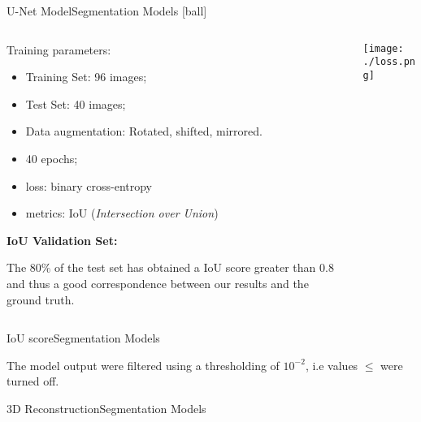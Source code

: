 \documentclass[10pt, technote, oribibl, unicode]{beamer}
\begin{document}
\begin{frame}{U-Net Model}{Segmentation Models}
  [ball]

  \begin{columns}
    \begin{column}{0.5\textwidth}

      \scriptsize{Training parameters:}
      \begin{itemize}
        \item Training Set: 96 images;
        \item Test Set: 40 images;
        \item Data augmentation:
              Rotated, shifted, mirrored.
        \item 40 epochs;
        \item loss: binary cross-entropy
        \item metrics: IoU (\emph{Intersection over Union})
      \end{itemize}

      \vspace{1cm}

      \scriptsize{\textbf{IoU Validation Set:}}

      \quad The $80\%$ of the test set has obtained a IoU score greater than $0.8$ and thus a good correspondence between our results and the ground truth.

    \end{column}
    \begin{column}{0.5\textwidth}
      \centering\texttt{[image: ./loss.png]}
    \end{column}
  \end{columns}

\end{frame}


\begin{frame}{IoU score}{Segmentation Models}

  \scriptsize{The model output were filtered using a thresholding of $10^{-2}$, i.e values $\leq$ were turned off.}

  \centering\def\svgwidth{\linewidth}

\end{frame}

\begin{frame}{3D Reconstruction}{Segmentation Models}

  \centering{}

\end{frame}
\end{document}
